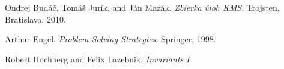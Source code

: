 \documentclass[11pt,a5paper]{article}
\begin{document}
\begin{thebibliography}{9}
 Ondrej Budáč, Tomáš Jurík, and Ján Mazák. \emph{Zbierka úloh KMS}. Trojsten, Bratislava, 2010.

Arthur Engel. \emph{Problem-Solving Strategies}. Springer, 1998.

 Robert Hochberg and Felix Lazebnik. \emph{Invariants $I$}

\end{thebibliography}
\end{document}
